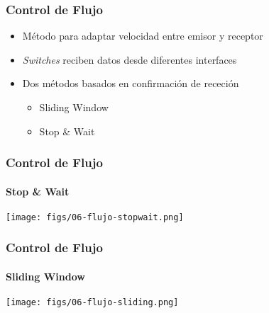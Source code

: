 \documentclass[letter]{beamer}
\begin{document}
\begin{frame}
  \frametitle{Control de Flujo}

  \begin{itemize}
    \item Método para adaptar velocidad entre emisor y receptor
    \item {\em Switches} reciben datos desde diferentes interfaces
    \item Dos métodos basados en confirmación de receción
      \begin{itemize}
        \item Sliding Window
        \item Stop \& Wait
      \end{itemize}
  \end{itemize}

\end{frame}  

\begin{frame}
  \frametitle{Control de Flujo}
  \framesubtitle{Stop \& Wait}

  \begin{center}
    \texttt{[image: figs/06-flujo-stopwait.png]}
  \end{center}


\end{frame}

\begin{frame}
  \frametitle{Control de Flujo}
  \framesubtitle{Sliding Window}

  \begin{center}
    \texttt{[image: figs/06-flujo-sliding.png]}
  \end{center}

\end{frame}


\end{document}

